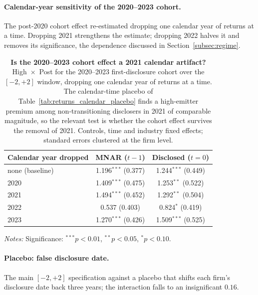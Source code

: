 \documentclass[a4paper,12pt]{article}
\begin{document}
\clearpage

\paragraph{Calendar-year sensitivity of the 2020--2023 cohort.} The post-2020
cohort effect re-estimated dropping one calendar year of returns at a time.
Dropping 2021 strengthens the estimate; dropping 2022 halves it and removes its
significance, the dependence discussed in Section~\ref{subsec:regime}.

\begin{table}[htbp]
\footnotesize\centering
\caption{\textbf{Is the 2020--2023 cohort effect a 2021 calendar artifact?}
High~$\times$~Post for the 2020--2023 first-disclosure cohort over the
$[-2,+2]$ window, dropping one calendar year of returns at a time. The
calendar-time placebo of Table~\ref{tab:returns_calendar_placebo} finds a
high-emitter premium among non-transitioning disclosers in 2021 of
comparable magnitude, so the relevant test is whether the cohort effect
survives the removal of 2021. Controls, time and industry fixed effects;
standard errors clustered at the firm level.}
\label{tab:returns_did_drop_year}
\begin{tabular}{lcc}
\toprule
Calendar year dropped & MNAR ($t-1$) & Disclosed ($t=0$) \\
\midrule
none (baseline) & 1.196$^{***}$ (0.377) & 1.244$^{***}$ (0.449) \\
2020 & 1.409$^{***}$ (0.475) & 1.253$^{**}$ (0.522) \\
2021 & 1.494$^{***}$ (0.452) & 1.292$^{**}$ (0.504) \\
2022 & 0.537 (0.403) & 0.824$^{*}$ (0.419) \\
2023 & 1.270$^{***}$ (0.426) & 1.509$^{***}$ (0.525) \\
\bottomrule
\end{tabular}
\begin{flushleft}\footnotesize
\textit{Notes:} Significance: $^{***}p<0.01$, $^{**}p<0.05$, $^{*}p<0.10$.
\end{flushleft}
\end{table}

\clearpage

\paragraph{Placebo: false disclosure date.} The main $[-2,+2]$ specification against
a placebo that shifts each firm's disclosure date back three years; the interaction
falls to an insignificant $0.16$.
\end{document}
